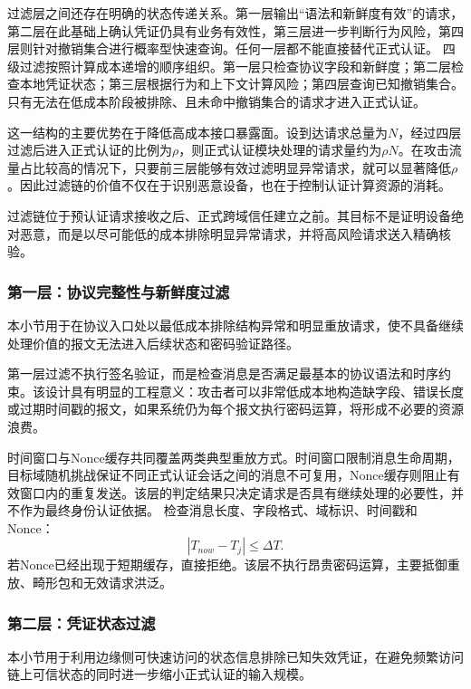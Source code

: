 \documentclass[conference]{IEEEtran}
\begin{document}
	过滤层之间还存在明确的状态传递关系。第一层输出“语法和新鲜度有效”的请求，第二层在此基础上确认凭证仍具有业务有效性，第三层进一步判断行为风险，第四层则针对撤销集合进行概率型快速查询。任何一层都不能直接替代正式认证。
	四级过滤按照计算成本递增的顺序组织。第一层只检查协议字段和新鲜度；第二层检查本地凭证状态；第三层根据行为和上下文计算风险；第四层查询已知撤销集合。只有无法在低成本阶段被排除、且未命中撤销集合的请求才进入正式认证。
	
	这一结构的主要优势在于降低高成本接口暴露面。设到达请求总量为$N$，经过四层过滤后进入正式认证的比例为$\rho$，则正式认证模块处理的请求量约为$\rho N$。在攻击流量占比较高的情况下，只要前三层能够有效过滤明显异常请求，就可以显著降低$\rho$。因此过滤链的价值不仅在于识别恶意设备，也在于控制认证计算资源的消耗。
	
	过滤链位于预认证请求接收之后、正式跨域信任建立之前。其目标不是证明设备绝对恶意，而是以尽可能低的成本排除明显异常请求，并将高风险请求送入精确核验。
	
	\subsubsection{第一层：协议完整性与新鲜度过滤}
	
	本小节用于在协议入口处以最低成本排除结构异常和明显重放请求，使不具备继续处理价值的报文无法进入后续状态和密码验证路径。
	
	第一层过滤不执行签名验证，而是检查消息是否满足最基本的协议语法和时序约束。该设计具有明显的工程意义：攻击者可以非常低成本地构造缺字段、错误长度或过期时间戳的报文，如果系统仍为每个报文执行密码运算，将形成不必要的资源浪费。
	
	时间窗口与Nonce缓存共同覆盖两类典型重放方式。时间窗口限制消息生命周期，目标域随机挑战保证不同正式认证会话之间的消息不可复用，Nonce缓存则阻止有效窗口内的重复发送。该层的判定结果只决定请求是否具有继续处理的必要性，并不作为最终身份认证依据。
	检查消息长度、字段格式、域标识、时间戳和Nonce：
	\begin{equation}
		|T_{now}-T_j|\le\Delta T.
	\end{equation}
	若Nonce已经出现于短期缓存，直接拒绝。该层不执行昂贵密码运算，主要抵御重放、畸形包和无效请求洪泛。
	
	\subsubsection{第二层：凭证状态过滤}
	
	本小节用于利用边缘侧可快速访问的状态信息排除已知失效凭证，在避免频繁访问链上可信状态的同时进一步缩小正式认证的输入规模。
	
\end{document}
